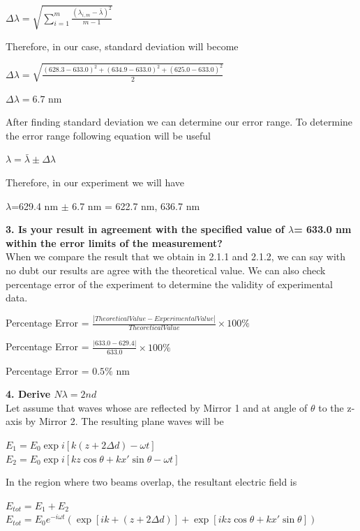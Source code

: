 \documentclass[a4paper,12pt]{report}
\begin{document}
\begin{center}
	{\Large $\Delta \lambda=\sqrt{\sum_{i=1}^{m}\frac{(\lambda_{i,m}-\bar{\lambda})^{2}}{m-1}}$}
\end{center}
Therefore, in our case, standard deviation will become
\begin{center}
	{\Large $\Delta \lambda=\sqrt{\frac{(628.3-633.0)^{2}+(634.9-633.0)^{2}+(625.0-633.0)^{2}}{2}}$}
\end{center}
\begin{center}
	{\Large $\Delta \lambda=6.7$ nm}
\end{center}
After finding standard deviation we can determine our error range. To determine the error range following equation will be useful
\begin{center}
{\large 	$\lambda=\bar{\lambda}\pm\Delta \lambda$}
\end{center}
Therefore, in our experiment we will have
\begin{center}
	$\lambda$=629.4 nm $\pm$ 6.7 nm = 622.7 nm, 636.7 nm
\end{center}
\textbf{3. Is your result in agreement with the specified value of $\lambda$= 633.0 nm within the error limits of the measurement?}\\
When we compare the result that we obtain in 2.1.1 and 2.1.2, we can say with no dubt our results are agree with the theoretical value. We can also check percentage error of the experiment to determine the validity of experimental data.
\begin{center}
	Percentage Error = $\frac{|Theoretical Value-Experimental Value|}{Theoretical Value}\times 100\%$
\end{center}
\begin{center}
	Percentage Error = $\frac{|633.0-629.4|}{633.0}\times 100\%$
\end{center}
\begin{center}
	Percentage Error = $0.5\%$ nm
\end{center}
\textbf{4. Derive $N\lambda=2 n d$}\\
Let assume that waves whose are reflected by Mirror 1 and at angle of $\theta$ to the z-axis by Mirror 2. The resulting plane waves will be 
\begin{center}
	$E_{1}=E_{0}\exp i [k(z+2\Delta d)-\omega t]$ \\
$E_{2}=E_{0}\exp i [kz\cos\theta+kx'\sin\theta-\omega t]$
\end{center}
In the region where two beams overlap, the resultant electric field is
\begin{center}
	$E_{tot}=E_{1}+E_{2}$\\
$E_{tot}=E_{0}e^{-i\omega t}(\exp[ik+(z+2\Delta d )]+\exp[ikz\cos\theta+kx'\sin\theta])$
\end{center}
\end{document}
